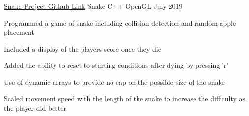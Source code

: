 

\begin{cventries}
    \cventry
    {\href{https://github.com/HDonovan96/Snake}{Snake Project Github Link}}
    {Snake}
    {C++ OpenGL}
    {July 2019}
    {
        \begin{cvitems}
            \item {Programmed a game of snake including collision detection and random apple placement}
            \item {Included a display of the players score once they die}
            \item {Added the ability to reset to starting conditions after dying by pressing 'r'}
            \item {Use of dynamic arrays to provide no cap on the possible size of the snake}
            \item {Scaled movement speed with the length of the snake to increase the difficulty as the player did better }
        \end{cvitems}  
    }

    
\end{cventries}